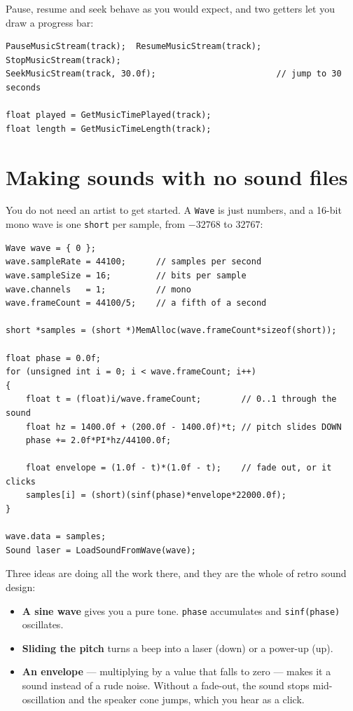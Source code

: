 
Pause, resume and seek behave as you would expect, and two getters let you draw a
progress bar:

\begin{lstlisting}
PauseMusicStream(track);  ResumeMusicStream(track);  StopMusicStream(track);
SeekMusicStream(track, 30.0f);                        // jump to 30 seconds

float played = GetMusicTimePlayed(track);
float length = GetMusicTimeLength(track);
\end{lstlisting}

\section{Making sounds with no sound files}

You do not need an artist to get started. A \lstinline|Wave| is just numbers, and
a 16-bit mono wave is one \lstinline|short| per sample, from $-32768$ to $32767$:

\begin{lstlisting}
Wave wave = { 0 };
wave.sampleRate = 44100;      // samples per second
wave.sampleSize = 16;         // bits per sample
wave.channels   = 1;          // mono
wave.frameCount = 44100/5;    // a fifth of a second

short *samples = (short *)MemAlloc(wave.frameCount*sizeof(short));

float phase = 0.0f;
for (unsigned int i = 0; i < wave.frameCount; i++)
{
    float t = (float)i/wave.frameCount;        // 0..1 through the sound
    float hz = 1400.0f + (200.0f - 1400.0f)*t; // pitch slides DOWN
    phase += 2.0f*PI*hz/44100.0f;

    float envelope = (1.0f - t)*(1.0f - t);    // fade out, or it clicks
    samples[i] = (short)(sinf(phase)*envelope*22000.0f);
}

wave.data = samples;
Sound laser = LoadSoundFromWave(wave);
\end{lstlisting}

Three ideas are doing all the work there, and they are the whole of retro sound
design:

\begin{itemize}[leftmargin=*,itemsep=3pt]
  \item \textbf{A sine wave} gives you a pure tone. \lstinline|phase| accumulates
        and \lstinline|sinf(phase)| oscillates.
  \item \textbf{Sliding the pitch} turns a beep into a laser (down) or a power-up
        (up).
  \item \textbf{An envelope} --- multiplying by a value that falls to zero ---
        makes it a sound instead of a rude noise. Without a fade-out, the sound
        stops mid-oscillation and the speaker cone jumps, which you hear as a
        click.
\end{itemize}


